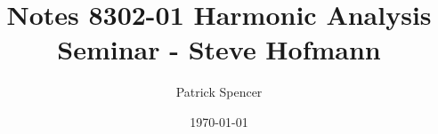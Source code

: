\documentclass[12pt,makeidx]{amsbook}
\begin{document}
\title{Notes 8302-01 Harmonic Analysis Seminar - Steve Hofmann}
\author{Patrick Spencer}

\date{\today}
\maketitle
\tableofcontents




\printindex
\printglossaries



\end{document}
